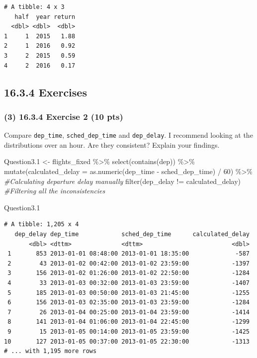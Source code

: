 \documentclass[
]{article}
\newenvironment{Shaded}{\begin{snugshade}}{\end{snugshade}}
\newcommand{\AttributeTok}[1]{\textcolor[rgb]{0.77,0.63,0.00}{#1}}
\newcommand{\CommentTok}[1]{\textcolor[rgb]{0.56,0.35,0.01}{\textit{#1}}}
\newcommand{\DecValTok}[1]{\textcolor[rgb]{0.00,0.00,0.81}{#1}}
\newcommand{\FloatTok}[1]{\textcolor[rgb]{0.00,0.00,0.81}{#1}}
\newcommand{\FunctionTok}[1]{\textcolor[rgb]{0.00,0.00,0.00}{#1}}
\newcommand{\NormalTok}[1]{#1}
\newcommand{\OtherTok}[1]{\textcolor[rgb]{0.56,0.35,0.01}{#1}}
\newcommand{\SpecialCharTok}[1]{\textcolor[rgb]{0.00,0.00,0.00}{#1}}
\newcommand{\StringTok}[1]{\textcolor[rgb]{0.31,0.60,0.02}{#1}}
\begin{document}
\begin{verbatim}
# A tibble: 4 x 3
   half  year return
  <dbl> <dbl>  <dbl>
1     1  2015   1.88
2     1  2016   0.92
3     2  2015   0.59
4     2  2016   0.17
\end{verbatim}

\hypertarget{exercises-2}{%
\subsection{16.3.4 Exercises}\label{exercises-2}}

\hypertarget{exercise-2-10-pts-1}{%
\subsubsection{(3) 16.3.4 Exercise 2 (10
pts)}\label{exercise-2-10-pts-1}}

Compare \texttt{dep\_time}, \texttt{sched\_dep\_time} and
\texttt{dep\_delay}. I recommend looking at the distributions over an
hour. Are they consistent? Explain your findings.

\begin{Shaded}
\begin{Highlighting}[]
\NormalTok{Question3}\FloatTok{.1} \OtherTok{\textless{}{-}}\NormalTok{ flights\_fixed }\SpecialCharTok{\%\textgreater{}\%} \FunctionTok{select}\NormalTok{(}\FunctionTok{contains}\NormalTok{(}\StringTok{\textquotesingle{}dep\textquotesingle{}}\NormalTok{)) }\SpecialCharTok{\%\textgreater{}\%}
  \FunctionTok{mutate}\NormalTok{(}\AttributeTok{calculated\_delay =} \FunctionTok{as.numeric}\NormalTok{(dep\_time }\SpecialCharTok{{-}}\NormalTok{ sched\_dep\_time) }\SpecialCharTok{/} \DecValTok{60}\NormalTok{) }\SpecialCharTok{\%\textgreater{}\%} \CommentTok{\#Calculating departure delay manually}
  \FunctionTok{filter}\NormalTok{(dep\_delay }\SpecialCharTok{!=}\NormalTok{ calculated\_delay) }\CommentTok{\#Filtering all the inconsistencies}

\NormalTok{Question3}\FloatTok{.1}
\end{Highlighting}
\end{Shaded}

\begin{verbatim}
# A tibble: 1,205 x 4
   dep_delay dep_time            sched_dep_time      calculated_delay
       <dbl> <dttm>              <dttm>                         <dbl>
 1       853 2013-01-01 08:48:00 2013-01-01 18:35:00             -587
 2        43 2013-01-02 00:42:00 2013-01-02 23:59:00            -1397
 3       156 2013-01-02 01:26:00 2013-01-02 22:50:00            -1284
 4        33 2013-01-03 00:32:00 2013-01-03 23:59:00            -1407
 5       185 2013-01-03 00:50:00 2013-01-03 21:45:00            -1255
 6       156 2013-01-03 02:35:00 2013-01-03 23:59:00            -1284
 7        26 2013-01-04 00:25:00 2013-01-04 23:59:00            -1414
 8       141 2013-01-04 01:06:00 2013-01-04 22:45:00            -1299
 9        15 2013-01-05 00:14:00 2013-01-05 23:59:00            -1425
10       127 2013-01-05 00:37:00 2013-01-05 22:30:00            -1313
# ... with 1,195 more rows
\end{verbatim}
\end{document}
